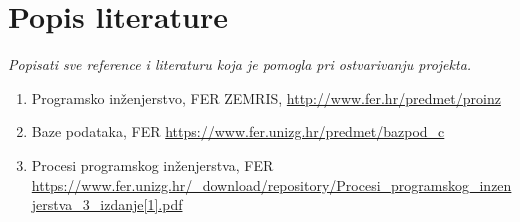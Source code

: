 \chapter*{Popis literature}
	
		\textit{Popisati sve reference i literaturu koja je pomogla pri ostvarivanju projekta.}
		
		
		\begin{enumerate}
			
			
			\item  Programsko inženjerstvo, FER ZEMRIS, \url{http://www.fer.hr/predmet/proinz}
			
			\item  Baze podataka, FER
			\url {https://www.fer.unizg.hr/predmet/bazpod_c}
			
			\item Procesi programskog inženjerstva, FER
			\url {https://www.fer.unizg.hr/_download/repository/Procesi_programskog_inzenjerstva_3_izdanje[1].pdf}
		\end{enumerate}
		
		 